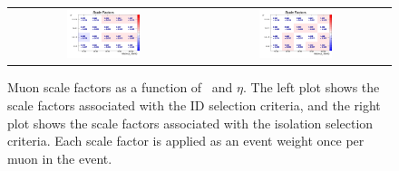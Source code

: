 \begin{figure}[!ht]
  \begin{center}
    \begin{tabular}{cc}
      \includegraphics[width=0.4\textwidth]{evtsel/figs/sf_mu_mediumID.pdf}  &
      \includegraphics[width=0.4\textwidth]{evtsel/figs/sf_mu_mini02.pdf}  \\
    \end{tabular}
    \caption{
      \label{fig:sf_muons}
      Muon scale factors as a function of \pt\ and $\eta$.
      The left plot shows the scale factors associated with the ID selection criteria,
      and the right plot shows the scale factors associated with the isolation selection criteria.
      Each scale factor is applied as an event weight once per muon in the event.
    }
  \end{center}
\end{figure}

